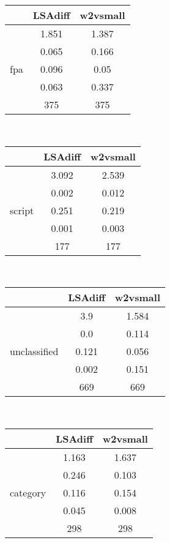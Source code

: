 \documentclass{article}
\begin{document}
\begin{tabular}{ccc|}\cline{2-3}
&\multicolumn{1}{|c}{LSAdiff} & w2vsmall \\\hline
\multicolumn{1}{|c|}{\multirow{5}{*}{fpa}} & 1.851 & 1.387 \\
\multicolumn{1}{|c|}{} & 0.065 & 0.166 \\
\multicolumn{1}{|c|}{} & 0.096 & 0.05 \\
\multicolumn{1}{|c|}{} & 0.063 & 0.337 \\
\multicolumn{1}{|c|}{} & 375 & 375 \\
\hline
\end{tabular}\\
\begin{tabular}{ccc|}\cline{2-3}
&\multicolumn{1}{|c}{LSAdiff} & w2vsmall \\\hline
\multicolumn{1}{|c|}{\multirow{5}{*}{script}} & 3.092 & 2.539 \\
\multicolumn{1}{|c|}{} & 0.002 & 0.012 \\
\multicolumn{1}{|c|}{} & 0.251 & 0.219 \\
\multicolumn{1}{|c|}{} & 0.001 & 0.003 \\
\multicolumn{1}{|c|}{} & 177 & 177 \\
\hline
\end{tabular}\\
\begin{tabular}{ccc|}\cline{2-3}
&\multicolumn{1}{|c}{LSAdiff} & w2vsmall \\\hline
\multicolumn{1}{|c|}{\multirow{5}{*}{unclassified}} & 3.9 & 1.584 \\
\multicolumn{1}{|c|}{} & 0.0 & 0.114 \\
\multicolumn{1}{|c|}{} & 0.121 & 0.056 \\
\multicolumn{1}{|c|}{} & 0.002 & 0.151 \\
\multicolumn{1}{|c|}{} & 669 & 669 \\
\hline
\end{tabular}\\
\begin{tabular}{ccc|}\cline{2-3}
&\multicolumn{1}{|c}{LSAdiff} & w2vsmall \\\hline
\multicolumn{1}{|c|}{\multirow{5}{*}{category}} & 1.163 & 1.637 \\
\multicolumn{1}{|c|}{} & 0.246 & 0.103 \\
\multicolumn{1}{|c|}{} & 0.116 & 0.154 \\
\multicolumn{1}{|c|}{} & 0.045 & 0.008 \\
\multicolumn{1}{|c|}{} & 298 & 298 \\
\hline
\end{tabular}\\
\end{document}
